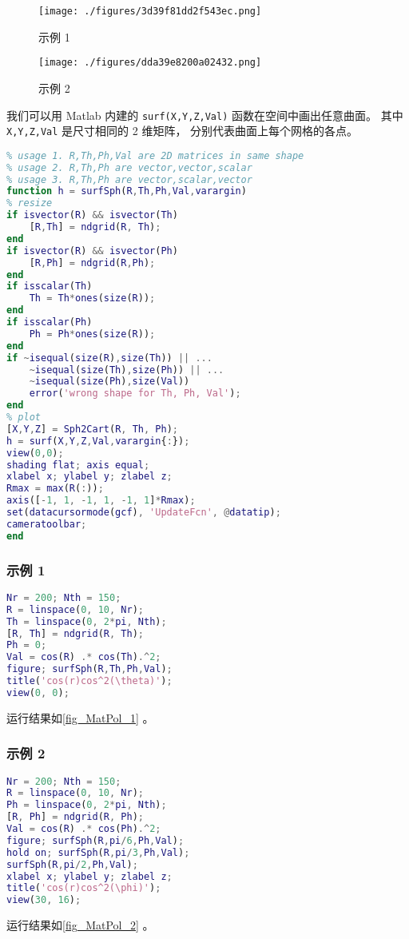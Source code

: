 
\begin{issues}
\issueAbstract
\end{issues}

\begin{figure}[ht]
\centering
\texttt{[image: ./figures/3d39f81dd2f543ec.png]}
\caption{示例 1} \label{fig_MatPol_1}
\end{figure}
\begin{figure}[ht]
\centering
\texttt{[image: ./figures/dda39e8200a02432.png]}
\caption{示例 2} \label{fig_MatPol_2}
\end{figure}

我们可以用 Matlab 内建的 \verb|surf(X,Y,Z,Val)| 函数在空间中画出任意曲面。 其中 \verb|X,Y,Z,Val| 是尺寸相同的 2 维矩阵， 分别代表曲面上每个网格的各点。
\begin{lstlisting}[language=matlab, caption=surfSph.m]
% surf() in spherical coordinate
% usage 1. R,Th,Ph,Val are 2D matrices in same shape
% usage 2. R,Th,Ph are vector,vector,scalar
% usage 3. R,Th,Ph are vector,scalar,vector
function h = surfSph(R,Th,Ph,Val,varargin)
% resize
if isvector(R) && isvector(Th)
    [R,Th] = ndgrid(R, Th);
end
if isvector(R) && isvector(Ph)
    [R,Ph] = ndgrid(R,Ph);
end
if isscalar(Th)
    Th = Th*ones(size(R));
end
if isscalar(Ph)
    Ph = Ph*ones(size(R));
end
if ~isequal(size(R),size(Th)) || ...
    ~isequal(size(Th),size(Ph)) || ...
    ~isequal(size(Ph),size(Val))
    error('wrong shape for Th, Ph, Val');
end
% plot
[X,Y,Z] = Sph2Cart(R, Th, Ph);
h = surf(X,Y,Z,Val,varargin{:});
view(0,0);
shading flat; axis equal;
xlabel x; ylabel y; zlabel z;
Rmax = max(R(:));
axis([-1, 1, -1, 1, -1, 1]*Rmax);
set(datacursormode(gcf), 'UpdateFcn', @datatip);
cameratoolbar;
end
\end{lstlisting}

\subsubsection{示例 1}
\begin{lstlisting}[language=matlab, caption=surfSph\_demo1.m]
Nr = 200; Nth = 150;
R = linspace(0, 10, Nr);
Th = linspace(0, 2*pi, Nth);
[R, Th] = ndgrid(R, Th);
Ph = 0;
Val = cos(R) .* cos(Th).^2;
figure; surfSph(R,Th,Ph,Val);
title('cos(r)cos^2(\theta)');
view(0, 0);
\end{lstlisting}
运行结果如\autoref{fig_MatPol_1} 。

\subsubsection{示例 2}
\begin{lstlisting}[language=matlab, caption=surfSph\_demo2.m]
Nr = 200; Nth = 150;
R = linspace(0, 10, Nr);
Ph = linspace(0, 2*pi, Nth);
[R, Ph] = ndgrid(R, Ph);
Val = cos(R) .* cos(Ph).^2;
figure; surfSph(R,pi/6,Ph,Val);
hold on; surfSph(R,pi/3,Ph,Val);
surfSph(R,pi/2,Ph,Val);
xlabel x; ylabel y; zlabel z;
title('cos(r)cos^2(\phi)');
view(30, 16);
\end{lstlisting}
运行结果如\autoref{fig_MatPol_2} 。
